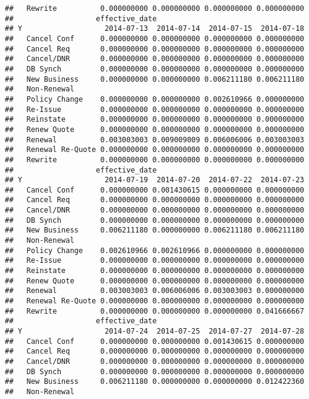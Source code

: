 \documentclass[]{article}
\begin{document}
\begin{verbatim}
##   Rewrite          0.000000000 0.000000000 0.000000000 0.000000000
##                   effective_date
## Y                   2014-07-13  2014-07-14  2014-07-15  2014-07-18
##   Cancel Conf      0.000000000 0.000000000 0.000000000 0.000000000
##   Cancel Req       0.000000000 0.000000000 0.000000000 0.000000000
##   Cancel/DNR       0.000000000 0.000000000 0.000000000 0.000000000
##   DB Synch         0.000000000 0.000000000 0.000000000 0.000000000
##   New Business     0.000000000 0.000000000 0.006211180 0.006211180
##   Non-Renewal                                                     
##   Policy Change    0.000000000 0.000000000 0.002610966 0.000000000
##   Re-Issue         0.000000000 0.000000000 0.000000000 0.000000000
##   Reinstate        0.000000000 0.000000000 0.000000000 0.000000000
##   Renew Quote      0.000000000 0.000000000 0.000000000 0.000000000
##   Renewal          0.003003003 0.009009009 0.006006006 0.003003003
##   Renewal Re-Quote 0.000000000 0.000000000 0.000000000 0.000000000
##   Rewrite          0.000000000 0.000000000 0.000000000 0.000000000
##                   effective_date
## Y                   2014-07-19  2014-07-20  2014-07-22  2014-07-23
##   Cancel Conf      0.000000000 0.001430615 0.000000000 0.000000000
##   Cancel Req       0.000000000 0.000000000 0.000000000 0.000000000
##   Cancel/DNR       0.000000000 0.000000000 0.000000000 0.000000000
##   DB Synch         0.000000000 0.000000000 0.000000000 0.000000000
##   New Business     0.006211180 0.000000000 0.006211180 0.006211180
##   Non-Renewal                                                     
##   Policy Change    0.002610966 0.002610966 0.000000000 0.000000000
##   Re-Issue         0.000000000 0.000000000 0.000000000 0.000000000
##   Reinstate        0.000000000 0.000000000 0.000000000 0.000000000
##   Renew Quote      0.000000000 0.000000000 0.000000000 0.000000000
##   Renewal          0.003003003 0.006006006 0.003003003 0.000000000
##   Renewal Re-Quote 0.000000000 0.000000000 0.000000000 0.000000000
##   Rewrite          0.000000000 0.000000000 0.000000000 0.041666667
##                   effective_date
## Y                   2014-07-24  2014-07-25  2014-07-27  2014-07-28
##   Cancel Conf      0.000000000 0.000000000 0.001430615 0.000000000
##   Cancel Req       0.000000000 0.000000000 0.000000000 0.000000000
##   Cancel/DNR       0.000000000 0.000000000 0.000000000 0.000000000
##   DB Synch         0.000000000 0.000000000 0.000000000 0.000000000
##   New Business     0.006211180 0.000000000 0.000000000 0.012422360
##   Non-Renewal                                                     

\end{verbatim}
\end{document}
